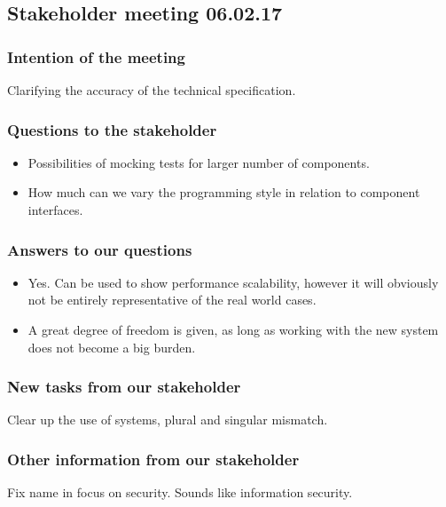 \documentclass{article}
\begin{document}
\begin{center}
\subsection*{Stakeholder meeting 06.02.17}
\end{center}

\bigskip


\subsubsection*{Intention of the meeting}
Clarifying the accuracy of the technical specification.


\subsubsection*{Questions to the stakeholder}
\begin{itemize}
    \item 
        Possibilities of mocking tests for larger number of components.
    
    \item
        How much can we vary the programming style in relation to component interfaces.
\end{itemize}


\subsubsection*{Answers to our questions}
\begin{itemize}
    \item 
        Yes. Can be used to show performance scalability, 
        however it will obviously not be entirely representative of the real world cases.

    \item
        A great degree of freedom is given, as long as working with the new system does not become a big burden.
\end{itemize}


\subsubsection*{New tasks from our stakeholder}
Clear up the use of systems, plural and singular mismatch.

\subsubsection*{Other information from our stakeholder}
Fix name in focus on security. Sounds like information security.
\end{document}
